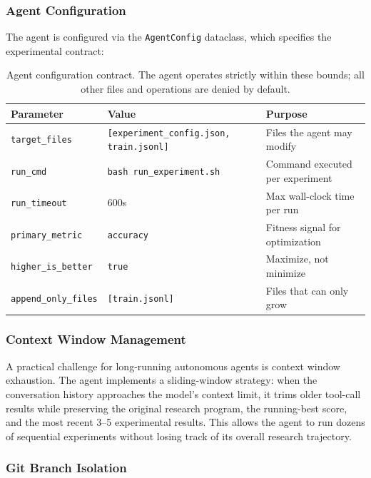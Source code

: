 \documentclass[11pt]{article}
\begin{document}
\subsubsection{Agent Configuration}

The agent is configured via the \texttt{AgentConfig} dataclass, which
specifies the experimental contract:

\begin{table}[h!]
\centering
\small
\begin{tabular}{@{}llp{6.5cm}@{}}
\toprule
Parameter & Value & Purpose \\
\midrule
\texttt{target\_files}    & \texttt{[experiment\_config.json, train.jsonl]} & Files the agent may modify \\
\texttt{run\_cmd}         & \texttt{bash run\_experiment.sh}               & Command executed per experiment \\
\texttt{run\_timeout}     & 600s                                           & Max wall-clock time per run \\
\texttt{primary\_metric}  & \texttt{accuracy}                              & Fitness signal for optimization \\
\texttt{higher\_is\_better} & \texttt{true}                                & Maximize, not minimize \\
\texttt{append\_only\_files} & \texttt{[train.jsonl]}                      & Files that can only grow \\
\bottomrule
\end{tabular}
\caption{Agent configuration contract. The agent operates strictly within
these bounds; all other files and operations are denied by default.}
\label{tab:agent_config}
\end{table}

\subsubsection{Context Window Management}

A practical challenge for long-running autonomous agents is context window
exhaustion. The agent implements a sliding-window strategy: when the
conversation history approaches the model's context limit, it trims
older tool-call results while preserving the original research program,
the running-best score, and the most recent 3--5 experimental results.
This allows the agent to run dozens of sequential experiments without
losing track of its overall research trajectory.

\subsubsection{Git Branch Isolation}
\end{document}
